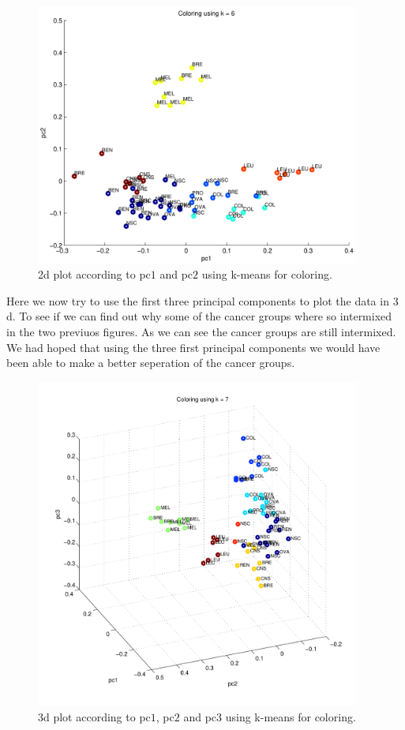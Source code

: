 \begin{figure}[!htbp]
  \centering \includegraphics[width=0.95\textwidth]{./images/q36pcs3}
  \caption{2d plot according to pc$1$ and pc$2$ using k-means for
    coloring.}
  \label{fig:q36pcs3}
\end{figure}

\newpage

Here we now try to use the first three principal components to plot
the data in $3$d. To see if we can find out why some of the cancer
groups where so intermixed in the two previuos figures. As we can see
the cancer groups are still intermixed. We had hoped that using the
three first principal components we would have been able to make a
better seperation of the cancer groups.

\begin{figure}[!htbp]
  \centering \includegraphics[width=0.95\textwidth]{./images/q36pcs4}
  \caption{3d plot according to pc$1$, pc$2$ and pc$3$ using k-means
    for coloring.}
  \label{fig:q36pcs4}
\end{figure}

